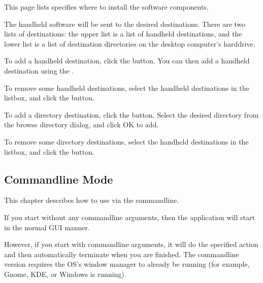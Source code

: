 This page lists specifies where to install the software components. 

The handheld software will be sent to the desired destinations. There are two 
lists of destinations: the upper list is a list of handheld destinations, and 
the lower list is a list of destination directories on the desktop computer's 
harddrive.

To add a handheld destination, click the 
button. You can then add a handheld destination using the
\helpignore{\ref{sec:pd-handheld-dest-dialog}}
.

To remove some handheld destinations, select the handheld destinations in 
the listbox, and click the  button.

To add a directory destination, click the 
 button. Select the desired directory 
from the browse directory dialog, and click OK to add. 

To remove some directory destinations, select the handheld destinations in 
the listbox, and click the  button.


\begin{helponly}
\chapter{Commandline Mode}\label{pd-commandline-mode}
This chapter describes how to use \brandingapplicationdesktopname via the commandline.
\end{helponly}


If you start \brandingapplicationdesktopname without any commandline arguments, then the 
application will start in the normal GUI manner.

However, if you start \brandingapplicationdesktopname with commandline arguments, it will do
the specified action and then automatically terminate when you are finished. 
The commandline version requires the OS's window manager to already be running 
(for example, Gnome, KDE, or Windows is running).

